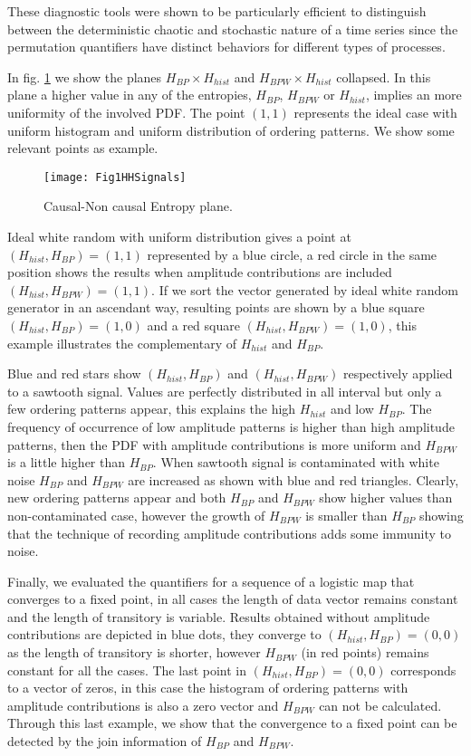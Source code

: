 These diagnostic tools were shown to be particularly efficient to distinguish between the deterministic chaotic and stochastic nature of a time series since the permutation quantifiers have distinct behaviors for different types of processes.

In fig. \ref{fig:HH} we show the planes $H_{BP} \times H_{hist}$ and $H_{BPW} \times H_{hist}$ collapsed.
In this plane a higher value in any of the entropies, $H_{BP}$, $H_{BPW}$ or $H_{hist}$, implies an more uniformity of the involved PDF.
The point $(1,1)$ represents the ideal case with uniform histogram and uniform distribution of ordering patterns.
We show some relevant points as example.
\begin{figure}[htpb]
	\centering	
	\texttt{[image: Fig1HHSignals]}
	\caption{Causal-Non causal Entropy plane.}
	\label{fig:HH}
\end{figure}

Ideal white random with uniform distribution gives a point at $(H_{hist}, H_{BP})=(1, 1)$ represented by a blue circle, a red circle in the same position shows the results when amplitude contributions are included $(H_{hist}, H_{BPW})=(1, 1)$.
If we sort the vector generated by ideal white random generator in an ascendant way, resulting points are shown by a blue square $(H_{hist}, H_{BP})=(1, 0)$ and a red square $(H_{hist}, H_{BPW})=(1, 0)$, this example illustrates the complementary of $H_{hist}$ and $H_{BP}$.

Blue and red stars show $(H_{hist}, H_{BP})$ and $(H_{hist}, H_{BPW})$ respectively applied to a sawtooth signal.
Values are perfectly distributed in all interval but only a few ordering patterns appear, this explains the high $H_{hist}$ and low $H_{BP}$.
The frequency of occurrence of low amplitude patterns is higher than high amplitude patterns, then the PDF with amplitude contributions is more uniform and $H_{BPW}$ is a little higher than $H_{BP}$.
When sawtooth signal is contaminated with white noise $H_{BP}$ and $H_{BPW}$ are increased as shown with blue and red triangles.
Clearly, new ordering patterns appear and both $H_{BP}$ and $H_{BPW}$ show higher values than non-contaminated case, however the growth of $H_{BPW}$ is smaller than $H_{BP}$ showing that the technique of recording amplitude contributions adds some immunity to noise.

Finally, we evaluated the quantifiers for a sequence of a logistic map that converges to a fixed point, in all cases the length of data vector remains constant and the length of transitory is variable.
Results obtained without amplitude contributions are depicted in blue dots, they converge to $(H_{hist}, H_{BP})=(0, 0)$ as the length of transitory is shorter, however $H_{BPW}$ (in red points) remains constant for all the cases.
The last point in $(H_{hist}, H_{BP})=(0, 0)$ corresponds to a vector of zeros, in this case the histogram of ordering patterns with amplitude contributions is also a zero vector and $H_{BPW}$ can not be calculated.
Through this last example, we show that the convergence to a fixed point can be detected by the join information of $H_{BP}$ and $H_{BPW}$.

